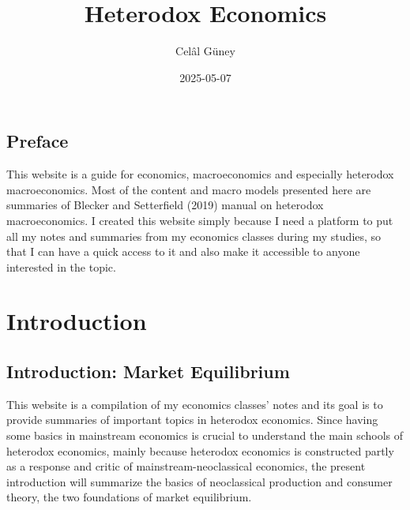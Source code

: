 \documentclass[
  letterpaper,
  DIV=11,
  numbers=noendperiod]{scrreprt}
\title{Heterodox Economics}
\author{Celâl Güney}
\date{2025-05-07}
\renewcommand*\contentsname{Table of contents}
\newcommand\contentsname{Table of contents}
\begin{document}
\maketitle
\ifdefined\Shaded\renewenvironment{Shaded}{\begin{tcolorbox}[interior hidden, boxrule=0pt, frame hidden, borderline west={3pt}{0pt}{shadecolor}, sharp corners, breakable, enhanced]}{\end{tcolorbox}}\fi

\renewcommand*\contentsname{Table of contents}
{
\hypersetup{linkcolor=}
\setcounter{tocdepth}{2}
\tableofcontents
}

\hypertarget{preface}{%
\chapter*{Preface}\label{preface}}


This website is a guide for economics, macroeconomics and especially
heterodox macroeconomics. Most of the content and macro models presented
here are summaries of Blecker and Setterfield (2019) manual on heterodox
macroeconomics. I created this website simply because I need a platform
to put all my notes and summaries from my economics classes during my
studies, so that I can have a quick access to it and also make it
accessible to anyone interested in the topic.

\part{Introduction}

\hypertarget{introduction-market-equilibrium}{%
\chapter{Introduction: Market
Equilibrium}\label{introduction-market-equilibrium}}

This website is a compilation of my economics classes' notes and its
goal is to provide summaries of important topics in heterodox economics.
Since having some basics in mainstream economics is crucial to
understand the main schools of heterodox economics, mainly because
heterodox economics is constructed partly as a response and critic of
mainstream-neoclassical economics, the present introduction will
summarize the basics of neoclassical production and consumer theory, the
two foundations of market equilibrium.
\end{document}
